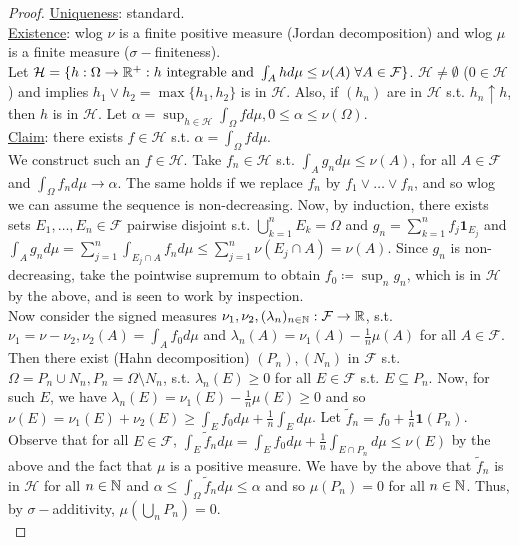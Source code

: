 \documentclass{article}
\begin{document}
\begin{proof}

\noindent\underline{Uniqueness}: standard.\\

\noindent \noindent\underline{Existence}: wlog $\nu$ is a finite positive measure (Jordan decomposition) and wlog $\mu$ is a finite measure ($\sigma-$finiteness).\\

Let $\mathcal{H}=\{h:\Omega\to\mathbb{R}^+: h \text{ integrable and } \int_A h d\mu\leq \nu(A) \;\forall A\in\mathcal{F}\}$. $\mathcal{H}\neq \emptyset$ ($0\in\mathcal{H}$) and  implies $h_1\lor h_2 = \max\{h_1,h_2\}$ is in $\mathcal{H}$. Also, if $(h_n)$ are in $\mathcal{H}$ s.t. $h_n\uparrow h$, then $h$ is in $\mathcal{H}$. Let $\alpha= \displaystyle\sup_{h\in\mathcal{H}}\int_\Omega f d\mu, 0\leq \alpha\leq \nu(\Omega)$.\\

\noindent\underline{Claim}: there exists $f\in\mathcal{H}$ s.t. $\alpha=\int_\Omega f d\mu$.\\

We construct such an $f\in\mathcal{H}$. Take $f_n\in\mathcal{H}$ s.t. $\int_A g_n d\mu\leq \nu(A)$, for all $A\in\mathcal{F}$ and $\int_\Omega f_n d\mu\to \alpha$. The same holds if we replace $f_n$ by $f_1\lor\dots\lor f_n$, and so wlog we can assume the sequence is non-decreasing. Now, by induction, there exists sets $E_1, \dots, E_n\in\mathcal{F}$ pairwise disjoint s.t. $\displaystyle\bigcup^n_{k=1}E_k=\Omega$ and $g_n=\displaystyle\sum_{k=1}^n f_j \mathbf{1}_{E_j}$ and 
$
\displaystyle \int_A g_n d\mu =\sum^n_{j=1}\int_{E_j\cap A} f_n d\mu \leq \sum^n_{j=1}\nu(E_j\cap A)=\nu(A).
$ Since $g_n$ is non-decreasing, take the pointwise supremum to obtain $f_0\coloneqq \sup_{n}g_n$, which is in $\mathcal{H}$ by the above, and is seen to work by inspection.\\

Now consider the signed measures $\nu_1, \nu_2, (\lambda_n)_{n\in\mathbb{N}}:\mathcal{F}\to\mathbb{R}$, s.t. $\nu_1=\nu-\nu_2, \nu_2(A)= \int_A f_0 d\mu$ and $\lambda_n(A)=\nu_1(A)-\frac{1}{n}\mu(A)$ for all $A\in\mathcal{F}$. Then there exist (Hahn decomposition) $(P_n), (N_n)$  in $\mathcal{F}$ s.t. $\Omega = P_n\displaystyle\cup N_n, P_n = \Omega\setminus N_n$, s.t. $\lambda_n(E)\geq 0 $ for all $E\in\mathcal{F}$ s.t. $E\subseteq P_n$. Now, for such $E$, we have $\lambda_n(E)=\nu_1(E)-\frac{1}{n}\mu(E)\geq 0$ and so $\nu(E)=\nu_1(E)+\nu_2(E)\geq \int_E f_0 d\mu+\frac{1}{n}\int_E d\mu$. Let $\tilde{f}_n=f_0+\frac{1}{n}\mathbf{1}(P_n)$. Observe that for all $E\in\mathcal{F}$, $\int_E \tilde{f}_n d\mu= \int_E f_0 d\mu+\frac{1}{n}\int_{E\cap P_n} d\mu\leq \nu(E)$ by the above and the fact that $\mu$ is a positive measure.  We have by the above that $\tilde{f}_n$ is in $\mathcal{H}$ for all $n\in\mathbb{N}$ and $\alpha\leq \int_\Omega \tilde{f}_n d\mu \leq \alpha$ and so $\mu(P_n)=0$ for all $n\in\mathbb{N}$. Thus, by $\sigma-$additivity, $\mu\left(\displaystyle\bigcup_n P_n\right)=0$.\\


\end{proof}
\end{document}
